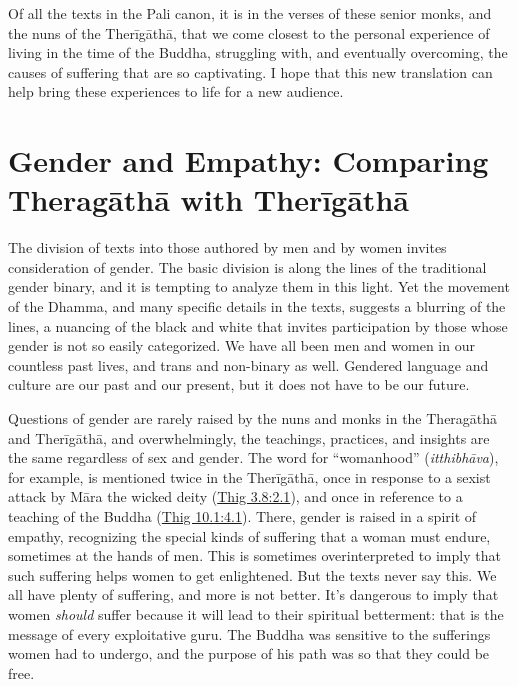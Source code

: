 \documentclass[12pt,openany]{book}%
\begin{document}
Of all the texts in the Pali canon, it is in the verses of these senior monks, and the nuns of the \textsanskrit{Therīgāthā}, that we come closest to the personal experience of living in the time of the Buddha, struggling with, and eventually overcoming, the causes of suffering that are so captivating. I hope that this new translation can help bring these experiences to life for a new audience.

\section*{Gender and Empathy: Comparing \textsanskrit{Theragāthā} with \textsanskrit{Therīgāthā}}

The division of texts into those authored by men and by women invites consideration of gender. The basic division is along the lines of the traditional gender binary, and it is tempting to analyze them in this light. Yet the movement of the Dhamma, and many specific details in the texts, suggests a blurring of the lines, a nuancing of the black and white that invites participation by those whose gender is not so easily categorized. We have all been men and women in our countless past lives, and trans and non-binary as well. Gendered language and culture are our past and our present, but it does not have to be our future.

Questions of gender are rarely raised by the nuns and monks in the \textsanskrit{Theragāthā} and \textsanskrit{Therīgāthā}, and overwhelmingly, the teachings, practices, and insights are the same regardless of sex and gender. The word for “womanhood” (\textit{\textsanskrit{itthibhāva}}), for example, is mentioned twice in the \textsanskrit{Therīgāthā}, once in response to a sexist attack by \textsanskrit{Māra} the wicked deity (\href{https://suttacentral.net/thig3.8/en/sujato\#2.1}{Thig 3.8:2.1}), and once in reference to a teaching of the Buddha (\href{https://suttacentral.net/thig10.1/en/sujato\#4.1}{Thig 10.1:4.1}). There, gender is raised in a spirit of empathy, recognizing the special kinds of suffering that a woman must endure, sometimes at the hands of men. This is sometimes overinterpreted to imply that such suffering helps women to get enlightened. But the texts never say this. We all have plenty of suffering, and more is not better. It’s dangerous to imply that women \emph{should} suffer because it will lead to their spiritual betterment: that is the message of every exploitative guru. The Buddha was sensitive to the sufferings women had to undergo, and the purpose of his path was so that they could be free.
\end{document}
